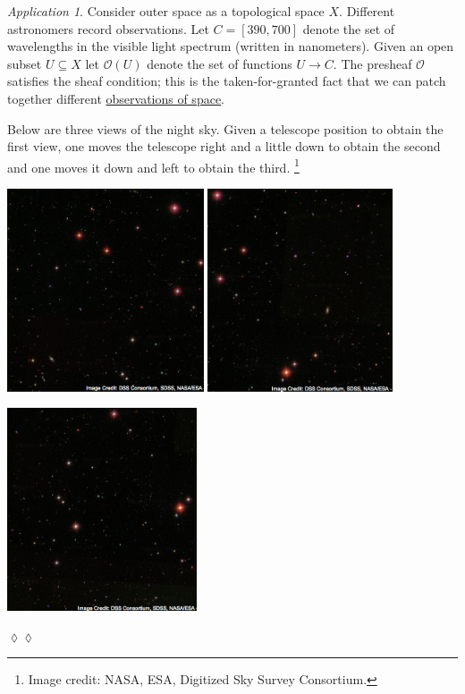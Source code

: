 \documentclass{book}
\def\mc{\mathcal}
\def\hsp{\hspace{.3in}}
\def\to{\rightarrow}
\def\ss{\subseteq}
\def\mcO{\mc{O}}
\theoremstyle{remark}
\newtheorem{app}[subsubsection]{Application}
\newenvironment{application}{\begin{app}}{\hspace*{\fill}$\lozenge\lozenge$\end{app}}
\theoremstyle{definition}
\begin{document}
\begin{application}

Consider outer space as a topological space $X$. Different astronomers record observations. Let $C=[390,700]$ denote the set of wavelengths in the visible light spectrum (written in nanometers). Given an open subset $U\ss X$ let $\mcO(U)$ denote the set of functions $U\to C$. The presheaf $\mcO$ satisfies the sheaf condition; this is the taken-for-granted fact that we can patch together different \href{http://en.wikipedia.org/wiki/Astrophotography}{\text observations of space}.

Below are three views of the night sky. Given a telescope position to obtain the first view, one moves the telescope right and a little down to obtain the second and one moves it down and left to obtain the third.
\footnote{Image credit: NASA, ESA, Digitized Sky Survey Consortium.}
\begin{center}\parbox{5.5in}{\begin{center}
\includegraphics[height=6cm]{Sky1}\hsp
\includegraphics[height=6cm]{Sky2}\end{center}
\hspace{1.8in}
\includegraphics[height=6cm]{Sky3}}\end{center}

\end{application}
\end{document}
